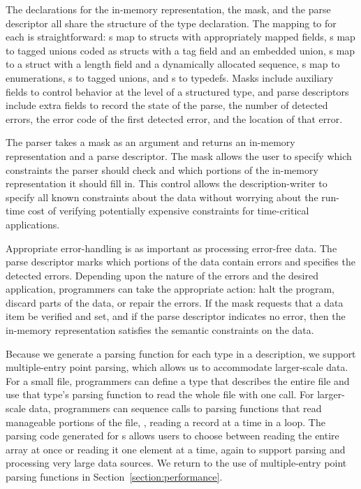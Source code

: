 The \C{} declarations for the in-memory representation, the mask, 
and the parse descriptor all share the structure of the \pads{}
type declaration.  The mapping to \C{} for each is straightforward: 
s map to \C{} structs with appropriately mapped fields, 
s map to tagged unions coded as \C{} structs with a tag field 
and an embedded 
union, s map to a \C{} struct with a length field and a 
dynamically allocated sequence, s map to \C{} enumerations, s 
to tagged unions, and s to \C{} typedefs.  Masks include
auxiliary fields to control behavior at the level of a structured
type, and parse descriptors include extra fields to record the 
state of the parse, the number of detected errors, 
the error code of the first detected error, and the location of that error.

The parser takes a mask as an argument and returns an
in-memory representation and a parse descriptor.  
The mask allows the user to specify 
which constraints the parser should check and which portions of the
in-memory representation it should fill in.  This control allows the
description-writer to specify all known constraints about the data
without worrying about the run-time cost of verifying potentially
expensive constraints for time-critical applications.

Appropriate error-handling is as important as processing error-free
data.  The parse descriptor marks which portions of the data contain
errors and specifies the detected errors.  Depending upon the nature
of the errors and the desired application, programmers can take the
appropriate action: halt the program, discard parts of the data, or
repair the errors.  If the mask requests that a data item be verified
and set, and if the parse descriptor indicates no error, then the
in-memory representation satisfies the semantic constraints on the
data.

Because we generate a parsing function for each type in a \pads{}
description, we support multiple-entry point parsing, which allows us
to accommodate larger-scale data.  For a small file, programmers can
define a \pads{} type that describes the entire file and use that
type's parsing function to read the whole file with one call.  For
larger-scale data, programmers can sequence calls to parsing functions
that read manageable portions of the file, \eg{}, reading a record at
a time in a loop.  The parsing code generated for s allows
users to choose between reading the entire array at once or reading it
one element at a time, again to support parsing and processing very
large data sources.  We return to the use of multiple-entry point
parsing functions in Section~\ref{section:performance}. 

